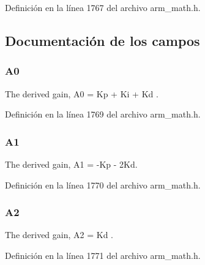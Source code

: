 Definición en la línea 1767 del archivo arm\+\_\+math.\+h.



\subsection{Documentación de los campos}
\subsubsection[{\texorpdfstring{A0}{A0}}]{ A0}\hypertarget{structarm__pid__instance__f32_afc2ed2bf70b7d9d84f49ee9ae7caa004}{}\label{structarm__pid__instance__f32_afc2ed2bf70b7d9d84f49ee9ae7caa004}
The derived gain, A0 = Kp + Ki + Kd . 

Definición en la línea 1769 del archivo arm\+\_\+math.\+h.

\subsubsection[{\texorpdfstring{A1}{A1}}]{ A1}\hypertarget{structarm__pid__instance__f32_a5e6785a3a5cf7b98f3bfc7b180d98273}{}\label{structarm__pid__instance__f32_a5e6785a3a5cf7b98f3bfc7b180d98273}
The derived gain, A1 = -\/\+Kp -\/ 2\+Kd. 

Definición en la línea 1770 del archivo arm\+\_\+math.\+h.

\subsubsection[{\texorpdfstring{A2}{A2}}]{ A2}\hypertarget{structarm__pid__instance__f32_a5b00947275caf079f351271bf41573fe}{}\label{structarm__pid__instance__f32_a5b00947275caf079f351271bf41573fe}
The derived gain, A2 = Kd . 

Definición en la línea 1771 del archivo arm\+\_\+math.\+h.


